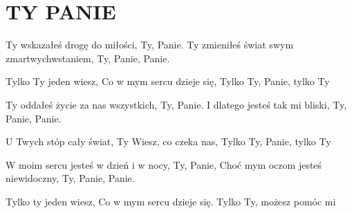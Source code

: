 \documentclass[../../../songbook.tex]{subfiles}
\begin{document}
\TabPositions{8cm} %
\section*{TY PANIE}
\vspace{0.5cm}
Ty wskazałeś drogę do miłości, 				 \newline
Ty, Panie.									 \newline
Ty zmieniłeś świat swym zmartwychwstaniem, 	 \newline
Ty, Panie, Panie.							 \newline

\-\hspace{1cm} Tylko Ty jeden wiesz,		 \newline
\-\hspace{1cm} Co w mym sercu dzieje się,	 \newline
\-\hspace{1cm} Tylko Ty, Panie, tylko Ty	 \newline

Ty oddałeś życie za nas wszystkich, 			\newline
Ty, Panie. 			\newline
I dlatego jesteś tak mi bliski,  			\newline
Ty, Panie, Panie. 			\newline

\-\hspace{1cm} U Twych stóp cały świat,  			\newline
\-\hspace{1cm} Ty Wiesz, co czeka nas, 			\newline
\-\hspace{1cm} Tylko Ty, Panie, tylko Ty 			\newline

W moim sercu jesteś w dzień i w nocy,  			\newline
Ty, Panie, 			\newline
Choć mym oczom jesteś niewidoczny,  			\newline
Ty, Panie, Panie. 			\newline

\-\hspace{1cm} Tylko ty jeden wiesz,  			\newline
\-\hspace{1cm} Co w mym sercu dzieje się. 			\newline
\-\hspace{1cm} Tylko Ty, możesz pomóc mi 			\newline
\end{document}
